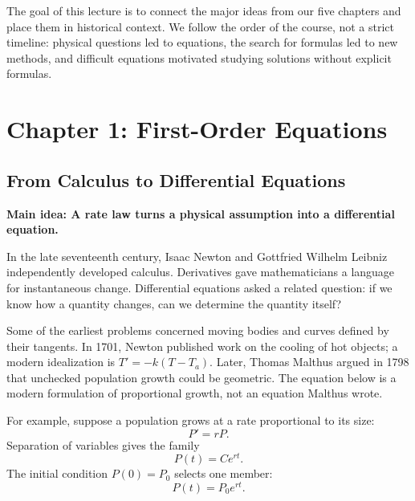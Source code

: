 \documentclass[11pt,letterpaper]{article}
\begin{document}


The goal of this lecture is to connect the major ideas
from our five chapters and place them in historical
context. We follow the order of the course, not a strict
timeline: physical questions led to equations, the search
for formulas led to new methods, and difficult equations
motivated studying solutions without explicit formulas.

\section{Chapter 1: First-Order Equations}

\subsection{From Calculus to Differential Equations}

\textbf{Main idea: A rate law turns a physical assumption into a differential equation.}

In the late seventeenth century, Isaac Newton and
Gottfried Wilhelm Leibniz independently developed
calculus. Derivatives gave mathematicians a language
for instantaneous change. Differential equations
asked a related question: if we know how a quantity
changes, can we determine the quantity itself?

Some of the earliest problems concerned moving bodies
and curves defined by their tangents. In 1701, Newton
published work on the cooling of hot objects; a modern
idealization is $T'=-k(T-T_a)$. Later, Thomas Malthus
argued in 1798 that unchecked population growth could
be geometric. The equation below is a modern formulation
of proportional growth, not an equation Malthus wrote.

For example, suppose a population grows at a rate
proportional to its size:
\[
P'=rP.
\]
Separation of variables gives the family
\[
P(t)=Ce^{rt}.
\]
The initial condition $P(0)=P_0$ selects one member:
\[
\boxed{P(t)=P_0e^{rt}.}
\]
\end{document}
